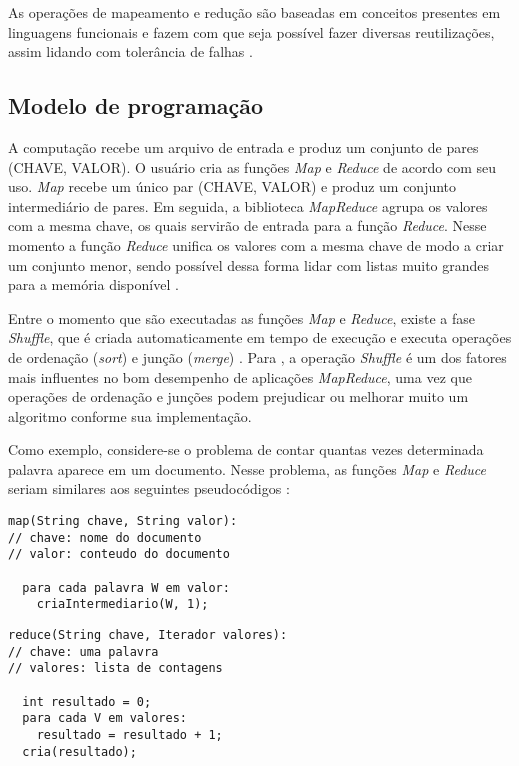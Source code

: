 As operações de mapeamento e redução são baseadas em conceitos presentes em linguagens funcionais e fazem com que seja possível fazer diversas reutilizações, assim lidando com tolerância de falhas \cite{MapReduce08}.

\subsection{Modelo de programação}\label{ssec:mapreducemodelo}

A computação recebe um arquivo de entrada e produz um conjunto de pares (CHAVE, VALOR). O usuário cria as funções \textit{Map} e \textit{Reduce} de acordo com seu uso. \textit{Map} recebe um único par (CHAVE, VALOR) e produz um conjunto intermediário de pares. Em seguida, a biblioteca \textit{MapReduce} agrupa os valores com a mesma chave, os quais servirão de entrada para a função \textit{Reduce}. Nesse momento a função \textit{Reduce} unifica os valores com a mesma chave de modo a criar um conjunto menor, sendo possível dessa forma lidar com listas muito grandes para a memória disponível \cite{MapReduce08}. 

Entre o momento que são executadas as funções \textit{Map} e \textit{Reduce}, existe a fase \textit{Shuffle}, que é criada automaticamente em tempo de execução e executa operações de ordenação (\textit{sort}) e junção (\textit{merge}) \cite{ProHadoop09}. Para \textcite{HadoopBook15}, a operação \textit{Shuffle} é um dos fatores mais influentes no bom desempenho de aplicações \textit{MapReduce}, uma vez que operações de ordenação e junções podem prejudicar ou melhorar muito um algoritmo conforme sua implementação.

Como exemplo, considere-se o problema de contar quantas vezes determinada palavra aparece em um documento. Nesse problema, as funções \textit{Map} e \textit{Reduce} seriam similares aos seguintes pseudocódigos \cite{MapReduce08}:

\begin{lstlisting}[caption={Exemplo de função Map em pseudocódigo adaptado de \cite{MapReduce08}}, label=code:codigo1]
map(String chave, String valor):
// chave: nome do documento
// valor: conteudo do documento

  para cada palavra W em valor:
    criaIntermediario(W, 1);
\end{lstlisting}

\begin{lstlisting}[caption={Exemplo de função Reduce em pseudocódigo adaptado de \cite{MapReduce08}}, label=code:codigo2]
reduce(String chave, Iterador valores):
// chave: uma palavra
// valores: lista de contagens

  int resultado = 0;
  para cada V em valores:
    resultado = resultado + 1;
  cria(resultado);
\end{lstlisting}

